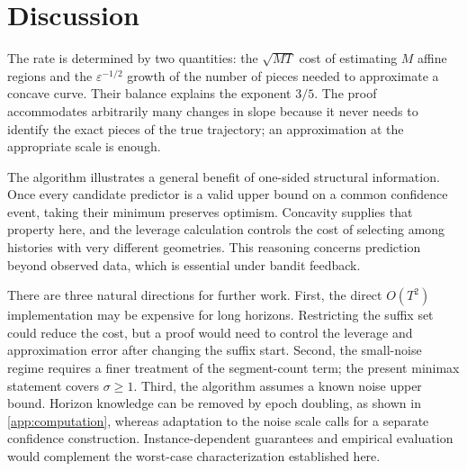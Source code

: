 \documentclass[11pt]{article}
\theoremstyle{remark}
\begin{document}
\section{Discussion}\label{sec:discussion}

The rate is determined by two quantities: the $\sqrt{MT}$ cost of estimating $M$ affine regions and the $\varepsilon^{-1/2}$ growth of the number of pieces needed to approximate a concave curve. Their balance explains the exponent $3/5$. The proof accommodates arbitrarily many changes in slope because it never needs to identify the exact pieces of the true trajectory; an approximation at the appropriate scale is enough.

The algorithm illustrates a general benefit of one-sided structural information. Once every candidate predictor is a valid upper bound on a common confidence event, taking their minimum preserves optimism. Concavity supplies that property here, and the leverage calculation controls the cost of selecting among histories with very different geometries. This reasoning concerns prediction beyond observed data, which is essential under bandit feedback.

There are three natural directions for further work. First, the direct $O(T^2)$ implementation may be expensive for long horizons. Restricting the suffix set could reduce the cost, but a proof would need to control the leverage and approximation error after changing the suffix start. Second, the small-noise regime requires a finer treatment of the segment-count term; the present minimax statement covers $\sigma\ge1$. Third, the algorithm assumes a known noise upper bound. Horizon knowledge can be removed by epoch doubling, as shown in \cref{app:computation}, whereas adaptation to the noise scale calls for a separate confidence construction. Instance-dependent guarantees and empirical evaluation would complement the worst-case characterization established here.

\FloatBarrier
\end{document}
